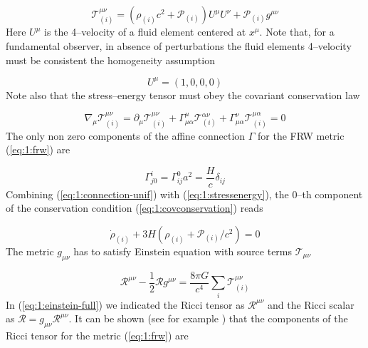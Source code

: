 \begin{equation}
\label{eq:1:stressenergy}
\mathcal{T}_{(i)}^{\mu\nu} = \left(\rho_{(i)}c^2+\mathcal{P}_{(i)}\right)U^\mu U^\nu + \mathcal{P}_{(i)}g^{\mu\nu}
\end{equation} 
%
Here $U^\mu$ is the 4--velocity of a fluid element centered at $x^\mu$. Note that, for a fundamental observer, in absence of perturbations the fluid elements 4--velocity must be consistent the homogeneity assumption 

\begin{equation}
\label{eq:1:4-momentum-unif}
U^\mu = (1,0,0,0)
\end{equation}
%
Note also that the stress--energy tensor must obey the covariant conservation law

\begin{equation}
\label{eq:1:covconservation}
\nabla_\mu \mathcal{T}^{\mu\nu}_{(i)} = \partial_\mu \mathcal{T}^{\mu\nu}_{(i)} + \Gamma_{\mu\alpha}^\mu \mathcal{T}^{\alpha\nu}_{(i)} + \Gamma^\nu_{\mu\alpha}\mathcal{T}^{\mu\alpha}_{(i)} = 0 
\end{equation} 
%
The only non zero components of the affine connection $\Gamma$ for the FRW metric (\ref{eq:1:frw}) are

\begin{equation}
\label{eq:1:connection-unif}
\Gamma^i_{j0} = {\Gamma^0_{ij}}{a^2} = \frac{H}{c}\delta_{ij}
\end{equation}
%
Combining (\ref{eq:1:connection-unif}) with (\ref{eq:1:stressenergy}), the 0--th component of the conservation condition (\ref{eq:1:covconservation}) reads

\begin{equation}
\label{eq:1:rho-conservation}
\dot{\rho}_{(i)} + 3H\left(\rho_{(i)} + \mathcal{P}_{(i)}/c^2\right) = 0
\end{equation}
%
The metric $g_{\mu\nu}$ has to satisfy Einstein equation with source terms $\mathcal{T}_{\mu\nu}$

\begin{equation}
\label{eq:1:einstein-full}
\mathcal{R}^{\mu\nu}-\frac{1}{2}\mathcal{R}g^{\mu\nu} = \frac{8\pi G}{c^4}\sum_i \mathcal{T}^{\mu\nu}_{(i)}
\end{equation}
%
In (\ref{eq:1:einstein-full}) we indicated the Ricci tensor as $\mathcal{R}^{\mu\nu}$ and the Ricci scalar as $\mathcal{R}=g_{\mu\nu}\mathcal{R}^{\mu\nu}$. It can be shown (see for example \citep{Dodelson-C1}) that the components of the Ricci tensor for the metric (\ref{eq:1:frw}) are 


